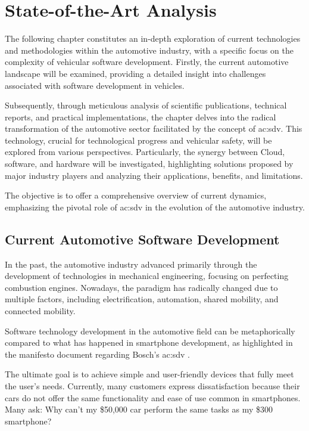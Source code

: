 
\chapter{State-of-the-Art Analysis} \label{ch:state-of-the-ArtAnalysis}
The following chapter constitutes an in-depth exploration of current technologies and methodologies within the automotive industry, with a specific focus on the complexity of vehicular software development. Firstly, the current automotive landscape will be examined, providing a detailed insight into challenges associated with software development in vehicles.

Subsequently, through meticulous analysis of scientific publications, technical reports, and practical implementations, the chapter delves into the radical transformation of the automotive sector facilitated by the concept of \gls{ac:sdv}. This technology, crucial for technological progress and vehicular safety, will be explored from various perspectives. Particularly, the synergy between Cloud, software, and hardware will be investigated, highlighting solutions proposed by major industry players and analyzing their applications, benefits, and limitations.

The objective is to offer a comprehensive overview of current dynamics, emphasizing the pivotal role of \gls{ac:sdv} in the evolution of the automotive industry.

\section{Current Automotive Software Development}

In the past, the automotive industry advanced primarily through the development of technologies in mechanical engineering, focusing on perfecting combustion engines. Nowadays, the paradigm has radically changed due to multiple factors, including electrification, automation, shared mobility, and connected mobility.

Software technology development in the automotive field can be metaphorically compared to what has happened in smartphone development, as highlighted in the manifesto document regarding Bosch's \gls{ac:sdv} \cite{SDVBoschMobility}.

The ultimate goal is to achieve simple and user-friendly devices that fully meet the user's needs. Currently, many customers express dissatisfaction because their cars do not offer the same functionality and ease of use common in smartphones. Many ask: Why can't my \$50,000 car perform the same tasks as my \$300 smartphone?

